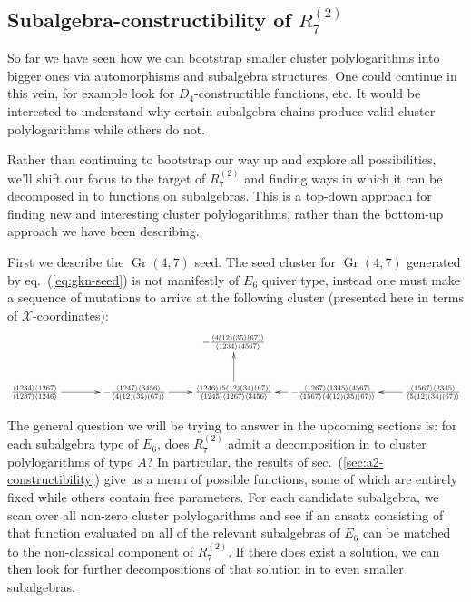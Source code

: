 \documentclass[11pt]{article}
\DeclareMathOperator{\Gr}{Gr}
\def\xcoords{$\mathcal{X}$-coordinates}
\def\pdfeq#1{\texorpdfstring{$#1$}{a}}
\begin{document}
\subsection{Subalgebra-constructibility of \pdfeq{R^{(2)}_7}}

So far we have seen how we can bootstrap smaller cluster polylogarithms into bigger ones via automorphisms and subalgebra structures. One could continue in this vein, for example look for $D_4$-constructible functions, etc. It would be interested to understand why certain subalgebra chains produce valid cluster polylogarithms while others do not. 

Rather than continuing to bootstrap our way up and explore all possibilities, we'll shift our focus to the target of $R^{(2)}_7$ and finding ways in which it can be decomposed in to functions on subalgebras. This is a top-down approach for finding new and interesting cluster polylogarithms, rather than the bottom-up approach we have been describing. 

First we describe the $\Gr(4,7)$ seed. The seed cluster for $\Gr(4,7)$ generated by eq.~(\ref{eq:gkn-seed}) is not manifestly of $E_6$ quiver type, instead one must make a sequence of mutations to arrive at the following cluster (presented here in terms of \xcoords):
\begin{equation}\label{eq:g47-seed}
\begin{gathered}
\begin{xy} 0;<1pt,0pt>:<0pt,-1pt>::
	(0,50) *+{\frac{\langle 1234\rangle  \langle 1267\rangle }{\langle
   		1237\rangle  \langle 1246\rangle }} ="1",
	(100,50) *+{-\frac{\langle 1247\rangle  \langle 3456\rangle
 	  	}{\langle 4(12)(35)(67)\rangle }} ="2",
	(200,50) *+{\frac{\langle 1246\rangle  \langle 5(12)(34)(67)\rangle
 	  	}{\langle 1245\rangle  \langle 1267\rangle  \langle
   		3456\rangle }} ="3",
	(200,0) *+{-\frac{\langle 4(12)(35)(67)\rangle }{\langle
   		1234\rangle  \langle 4567\rangle }} ="4",
	(300,50) *+{-\frac{\langle 1267\rangle  \langle 1345\rangle  \langle
   		4567\rangle }{\langle 1567\rangle  \langle
   		4(12)(35)(67)\rangle }} ="5",
	(400,50) *+{\frac{\langle 1567\rangle  \langle 2345\rangle }{\langle
   		5(12)(34)(67)\rangle }} ="6",
	"1", {\ar"2"},
	"2", {\ar"3"},
	"3", {\ar"4"},
	"5", {\ar"3"},
	"6", {\ar"5"},
\end{xy}
\end{gathered}
\end{equation}

The general question we will be trying to answer in the upcoming sections is: for each subalgebra type of $E_6$, does $R^{(2)}_7$ admit a decomposition in to cluster polylogarithms of type $A$? In particular, the results of sec.~(\ref{sec:a2-constructibility}) give us a menu of possible functions, some of which are entirely fixed while others contain free parameters. For each candidate subalgebra, we scan over all non-zero cluster polylogarithms and see if an ansatz consisting of that function evaluated on all of the relevant subalgebras of $E_6$ can be matched to the non-classical component of $R^{(2)}_7$. If there does exist a solution, we can then look for further decompositions of that solution in to even smaller subalgebras. 
\end{document}
